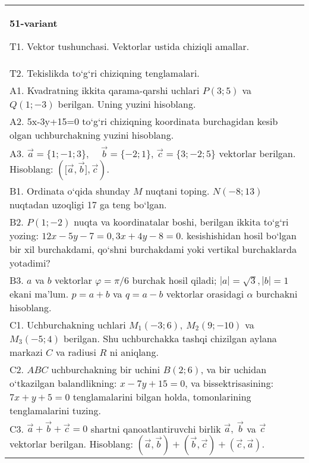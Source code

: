 \documentclass{article}
\begin{document}
\begin{tabular}{m{17cm}}
\textbf{51-variant}
\newline

T1. 
Vektor tushunchasi. Vektorlar ustida chiziqli amallar.
 \\
T2. 
Tekislikda to‘g‘ri chiziqning tenglamalari.
 \\
A1. 
Kvadratning ikkita qarama-qarshi uchlari $P (3; 5) $ va
$Q (1; -3) $ berilgan. Uning yuzini hisoblang.
 \\
A2. 
5x-3y+15=0 to‘g‘ri chiziqning koordinata burchagidan
kesib olgan uchburchakning yuzini hisoblang.
 \\
A3. 
$\overrightarrow{a}
= \{ 1; - 1;3\}, \ \ \ \ \ \overrightarrow{b} = \{ - 2;1\}$, $\overrightarrow{c} = \{3; -2;5\}$ vektorlar berilgan. Hisoblang:
$ (\lbrack\overrightarrow{a},\overrightarrow{b}\rbrack,\overrightarrow{c}) $.
 \\
B1. 
Ordinata o‘qida shunday $M$ nuqtani toping.
\(N (-8;13) \) nuqtadan uzoqligi 17 ga teng bo‘lgan.
 \\
B2. 
\(P (1;-2) \) nuqta va koordinatalar boshi, berilgan ikkita
to‘g‘ri yozing: $12x-5y-7=0, 3x+4y-8=0$.
kesishishidan hosil bo‘lgan bir xil burchakdami, qo‘shni burchakdami yoki vertikal
burchaklarda yotadimi?
 \\
B3. 
$a$ va $b$ vektorlar $\varphi = \pi/6$ burchak hosil qiladi; $|a| = \sqrt{3},|b| = 1$ ekani ma’lum. $p = a + b$ va $q = a - b$ vektorlar orasidagi $\alpha$ burchakni hisoblang.
 \\
C1. 
Uchburchakning uchlari \(M_{1} (- 3;6),\ M_{2} (9; - 10) \)
va \(M_{3} (-5;4) \) berilgan. Shu uchburchakka tashqi chizilgan
aylana markazi $C$ va radiusi $R$ ni aniqlang.
 \\
C2. 
$ABC$ uchburchakning bir uchini \(B (2;6) \), va
bir uchidan o‘tkazilgan balandlikning: \(x - 7y + 15 = 0\), va
bissektrisasining: \(7x + y + 5 = 0\) tenglamalarini bilgan holda,
tomonlarining tenglamalarini tuzing. \\
C3. \(\vec{a} + \vec{b} + \vec{c} = 0\) shartni qanoatlantiruvchi birlik \(\vec{a},\ \vec{b}\) va \(\vec{c}\) vektorlar berilgan. Hisoblang: \(\left(\vec{a},\vec{b} \right) + \left(\vec{b},\vec{c} \right) + \left(\vec{c},\vec{a} \right) \).
 \\

\end{tabular}
\vspace{1cm}
\end{document}
